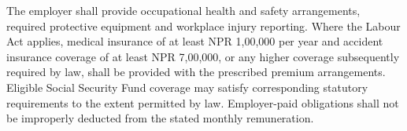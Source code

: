 The employer shall provide occupational health and safety arrangements, required
protective equipment and workplace injury reporting. Where the Labour Act applies,
medical insurance of at least NPR 1,00,000 per year and accident insurance
coverage of at least NPR 7,00,000, or any higher coverage subsequently
required by law, shall be provided with the prescribed premium arrangements.
Eligible Social Security Fund coverage may satisfy corresponding statutory
requirements to the extent permitted by law. Employer-paid obligations shall
not be improperly deducted from the stated monthly remuneration.
